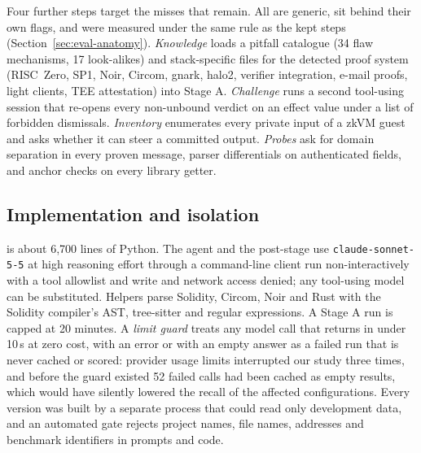 Four further steps target the misses that remain. All are generic, sit
behind their own flags, and were measured under the same rule as the kept
steps (Section~\ref{sec:eval-anatomy}). \emph{Knowledge} loads a pitfall
catalogue (34 flaw mechanisms, 17 look-alikes) and stack-specific files for
the detected proof system (RISC~Zero, SP1, Noir, Circom, gnark, halo2,
verifier integration, e-mail proofs, light clients, TEE attestation) into
Stage A. \emph{Challenge} runs a second tool-using session that re-opens every
non-unbound verdict on an effect value under a list of forbidden dismissals.
\emph{Inventory} enumerates every private input of a zkVM guest and asks
whether it can steer a committed output. \emph{Probes} ask for domain
separation in every proven message, parser differentials on authenticated
fields, and anchor checks on every library getter.

\subsection{Implementation and isolation}\label{sec:design-impl}

\tool{} is about 6,700 lines of Python. The agent and the post-stage use
\texttt{claude-sonnet-5-5} at high reasoning effort through a command-line
client run non-interactively with a tool allowlist and write and network
access denied; any tool-using model can be substituted. Helpers parse
Solidity, Circom, Noir and Rust with the Solidity compiler's AST, tree-sitter
and regular expressions. A Stage A run is capped at 20 minutes. A
\emph{limit guard} treats any model call that returns in under 10\,s at zero
cost, with an error or with an empty answer as a failed run that is never
cached or scored: provider usage limits interrupted our study three times,
and before the guard existed 52 failed calls had been cached as empty
results, which would have silently lowered the recall of the affected
configurations. Every version was built by a separate process that could read
only development data, and an automated gate rejects project names, file
names, addresses and benchmark identifiers in prompts and code.
